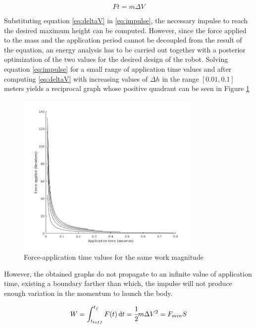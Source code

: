 \begin{equation}
\label{eq:impulse}
	F  t = m  \Delta V	
\end{equation} 

Substituting equation \ref{eq:deltaV} in \ref{eq:impulse}, the necessary impulse to reach the desired maximum height can be computed.
However, since the force applied to the mass and the application period cannot be decoupled from the result of the equation, an energy analysis has to be carried out together with a posterior optimization of the two values for the desired design of the robot.
Solving equation \ref{eq:impulse} for a small range of application time values and after computing \ref{eq:deltaV} with increasing values of $\Delta h$ in the range $[0.01,0.1]$ meters yields a reciprocal graph whose positive quadrant can be seen in Figure \ref{fig:f-t}

\begin{figure}[ht!]
	\centering
	\includegraphics[width=0.8\textwidth]{figures/force-timePlot.png}
	\caption{Force-application time values for the same work magnitude}
	\label{fig:f-t}
\end{figure}

However, the obtained graphs do not propagate to an infinite value of application time, existing a boundary farther than which, the impulse will not produce enough variation in the momentum to launch the body.

\begin{equation}
\label{eq:work}
	W = \int_{t_{toff}}^{t_{f}} F(t)\,\mathrm{d}t = \cfrac{1}{2} m \Delta V^2 = F_{min} S
\end{equation}

